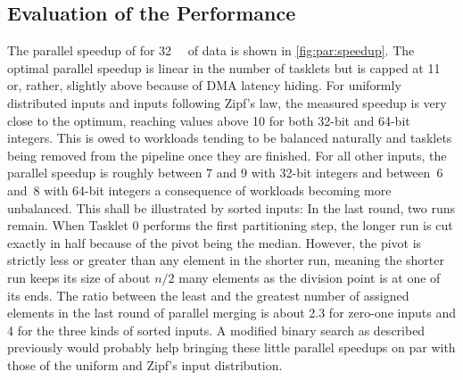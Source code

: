 \subsection{Evaluation of the Performance}
\label{sec:mram:par:performance}

The parallel speedup of \MS{} for \qty{32}{\mebi\byte} of data is shown in \cref{fig:par:speedup}.
The optimal parallel speedup is linear in the number of tasklets but is capped at 11 or, rather, slightly above because of \ac{DMA} latency hiding.
For uniformly distributed inputs and inputs following Zipf's law, the measured speedup is very close to the optimum, reaching values above 10 for both 32-bit and 64-bit integers.
This is owed to workloads tending to be balanced naturally and tasklets being removed from the pipeline once they are finished.
For all other inputs, the parallel speedup is roughly between 7 and 9 with 32-bit integers and between~6 and~8 with 64-bit integers \Dash a consequence of workloads becoming more unbalanced.
This shall be illustrated by sorted inputs:
In the last round, two runs remain.
When Tasklet 0 performs the first partitioning step, the longer run is cut exactly in half because of the pivot being the median.
However, the pivot is strictly less or greater than any element in the shorter run, meaning the shorter run keeps its size of about \(n/2\) many elements as the division point is at one of its ends.
The ratio between the least and the greatest number of assigned elements in the last round of parallel merging is about 2.3 for zero-one inputs and 4 for the three kinds of sorted inputs.
A modified binary search as described previously would probably help bringing these little parallel speedups on par with those of the uniform and Zipf's input distribution.

